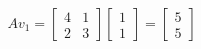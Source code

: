 \documentclass{article}
\begin{document}
\begin{align*}
Av_1 = \begin{bmatrix}4&1\\2&3\end{bmatrix}\begin{bmatrix}1\\1\end{bmatrix}= \begin{bmatrix}5\\5\end{bmatrix}
\end{align*}
\end{document}
